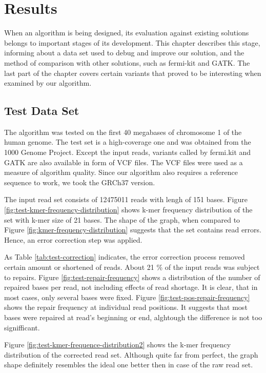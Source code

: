 \chapter{Results}
\label{chap:results}

When an algorithm is being designed, its evaluation against existing solutions belongs to important stages of its development. This chapter describes this stage, informing about a data set used to debug and improve our solution, and the method of comparison with other solutions, such as fermi-kit and GATK. The last part of the chapter covers certain variants that proved to be interesting when examined by our algorithm.

\section{Test Data Set}
\label{sec:test-data-set}

The algorithm was tested on the first 40 megabases of chromosome 1 of the human genome. The test set is a high-coverage one and was obtained from the 1000 Genome Project. Except the input reads, variants called by fermi.kit and GATK are also available in form of VCF files. The VCF files were used as a measure of algorithm quality. Since our algorithm also requires a reference sequence to work, we took the GRCh37 version.

The input read set consists of 12475011 reads with lengh of 151 bases. Figure \ref{fig:test-kmer-frequency-distribution} shows k-mer frequency distribution of the set with k-mer size of 21 bases. The shape of the graph, when compared to Figure \ref{fig:kmer-frequency-distribution} suggests that the set contains read errors. Hence, an error correction step was applied.

As Table \ref{tab:test-correction} indicates, the error correction process removed certain amount or shortened of reads. About 21 \% of the input reads was subject to repairs. Figure \ref{fig:test-repair-frequency} shows a distribution of the number of repaired bases per read, not including effects of read shortage. It is clear, that in most cases, only several bases were fixed. Figure \ref{fig:test-pos-repair-frequency} shows the repair frequency at individual read positions. It suggests that most bases were repaired at read's beginning or end, alghtough the difference is not too signifficant.

Figure \ref{fig:test-kmer-frequence-distribution2} shows the k-mer frequency distribution of the corrected read set. Although quite far from perfect, the graph shape definitely resembles the ideal one better then in case of the raw  read set. 

